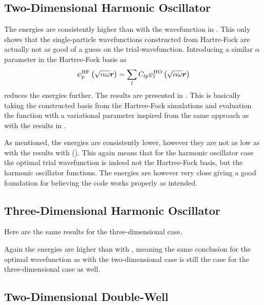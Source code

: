 \subsection{Two-Dimensional Harmonic Oscillator}
    

    

    The energies are consistently higher than with the wavefunction in
    . This only shows that the single-particle
    wavefunctions constructed from Hartre-Fock are actually not as good of a
    guess on the trial-wavefunction. Introducing a similar $\alpha$ parameter
    in the Hartree-Fock basis as
        \begin{equation}
            \psi^{\text{HF}}_p\left(\sqrt{\alpha\omega}\boldsymbol{{r}}\right) = \sum_l
            C_{lp} \psi^{\text{HO}}_l \left(\sqrt{\alpha\omega}\boldsymbol{{r}}\right)
            \label{eq:HFVARWAVE}
        \end{equation}
    reduces the energies further. The results are presented in
    . This is basically taking the constructed basis from
    the Hartree-Fock simulations and evaluation the function with a variational
    parameter inspired from the same approach as with the results in
    .
    
    

    As mentioned, the energies are consistently lower, however they are not as
    low as with the results with ().
    This again means that for the harmonic oscillator case the optimal trial
    wavefunction is indeed not the Hartree-Fock basis, but the harmonic
    oscillator functions. The energies are however very close giving a good
    foundation for believing the code works properly as intended.

\subsection{Three-Dimensional Harmonic Oscillator}
    Here are the same results for the three-dimensional case.
    
    
    

    Again the energies are higher than with , meaning
    the same conclusion for the optimal wavefunction as with the
    two-dimensional case is still the case for the three-dimensional case as
    well.

\subsection{Two-Dimensional Double-Well}
    
    

